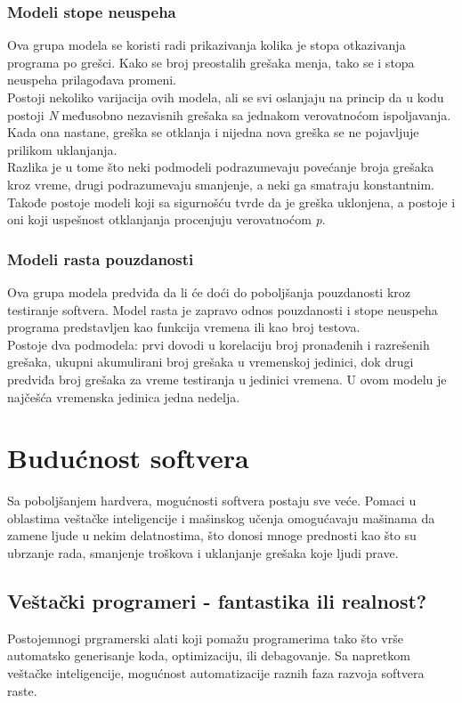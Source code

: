 \documentclass[a4paper]{article}
\begin{document}
\subsubsection{Modeli stope neuspeha}
\label{subsec:stopa_neuspeha}

Ova grupa modela se koristi radi prikazivanja kolika je stopa otkazivanja programa po grešci. Kako se broj preostalih grešaka menja, tako se i stopa neuspeha prilagođava promeni.\\
Postoji nekoliko varijacija ovih modela, ali se svi oslanjaju na princip da u kodu postoji \textit{N} međusobno nezavisnih grešaka sa jednakom verovatnoćom ispoljavanja. Kada ona nastane, greška se otklanja i nijedna nova greška se ne pojavljuje prilikom uklanjanja.\\
Razlika je u tome što neki podmodeli podrazumevaju povećanje broja grešaka kroz vreme, drugi podrazumevaju smanjenje, a neki ga smatraju konstantnim. Takođe postoje modeli koji sa sigurnošću tvrde da je greška uklonjena, a postoje i oni koji uspešnost otklanjanja procenjuju verovatnoćom \textit{p}.

\subsubsection{Modeli rasta pouzdanosti}
\label{subsec:rast_pouzdanosti}

Ova grupa modela predviđa da li će doći do poboljšanja pouzdanosti kroz testiranje softvera. Model rasta je zapravo odnos pouzdanosti i stope neuspeha programa predstavljen kao funkcija vremena ili kao broj testova.\\
Postoje dva podmodela: prvi dovodi u korelaciju broj pronađenih i razrešenih grešaka, ukupni akumulirani broj grešaka u vremenskoj jedinici, dok drugi predviđa broj grešaka za vreme testiranja u jedinici vremena. U ovom modelu je najčešća vremenska jedinica jedna nedelja.


\section{Budućnost softvera}
\label{sec:buducnost}

Sa poboljšanjem hardvera, mogućnosti softvera postaju sve veće. Pomaci u oblastima veštačke inteligencije i mašinskog učenja omogućavaju mašinama da zamene ljude u nekim delatnostima, što donosi mnoge prednosti kao što su ubrzanje rada, smanjenje troškova i uklanjanje grešaka koje ljudi prave.

\subsection{Veštački programeri - fantastika ili realnost?}
Postojemnogi prgramerski alati koji pomažu programerima tako što vrše automatsko generisanje koda, optimizaciju, ili debagovanje.
Sa napretkom veštačke inteligencije, mogućnost automatizacije raznih faza razvoja softvera raste.
\end{document}
